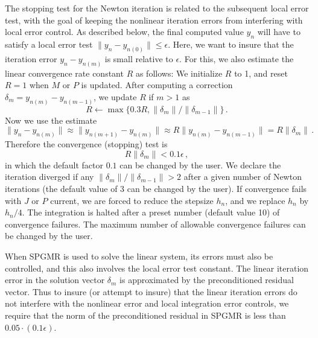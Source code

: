 The stopping test for the Newton iteration is related to the
subsequent local error test, with the goal of keeping the nonlinear
iteration errors from interfering with local error control.  As
described below, the final computed value $y_n$ will have to satisfy a
local error test $\| y_n - y_{n(0)} \| \leq \epsilon$.  Here, we want
to insure that the iteration error $y_n - y_{n(m)}$ is small relative
to $\epsilon$.
For this, we also estimate the linear convergence rate constant $R$ as
follows: We initialize $R$ to 1, and reset $R = 1$ when $M$ or $P$ is
updated.  After computing a correction $\delta_m = y_{n(m)}-y_{n(m-1)}$,
we update $R$ if $m > 1$ as
\begin{equation*}
  R \leftarrow \max\{0.3R , \|\delta_m\| / \|\delta_{m-1}\| \} \, . 
\end{equation*}
Now we use the estimate
\begin{equation*}
  \| y_n - y_{n(m)} \| \approx \| y_{n(m+1)} - y_{n(m)} \| 
  \approx R \| y_{n(m)} - y_{n(m-1)} \|  =  R \|\delta_m \| \, . 
\end{equation*}
Therefore the convergence (stopping) test is 
\begin{equation*}
  R \|\delta_m \| < 0.1 \epsilon \, , 
\end{equation*}
in which the default factor $0.1$ can be changed by the user. We declare the 
iteration diverged if any $\|\delta_m\| / \|\delta_{m-1}\| > 2$ after a given 
number of Newton iterations (the default value of 3 can be changed by the user).  
If convergence fails with $J$ or $P$ current, we are forced to reduce the stepsize
$h_n$, and we replace $h_n$ by $h_n/4$.
The integration is halted after a preset number (default value 10) of convergence 
failures. The maximum number of allowable convergence failures can be
changed by the user.

When SPGMR is used to solve the linear system, its errors must also be
controlled, and this also involves the local error test constant.  The
linear iteration error in the solution vector $\delta_m$ is
approximated by the preconditioned residual vector.  Thus to insure
(or attempt to insure) that the linear iteration errors do not
interfere with the nonlinear error and local integration error
controls, we require that the norm of the preconditioned residual
in SPGMR is less than $0.05 \cdot (0.1 \epsilon)$.


